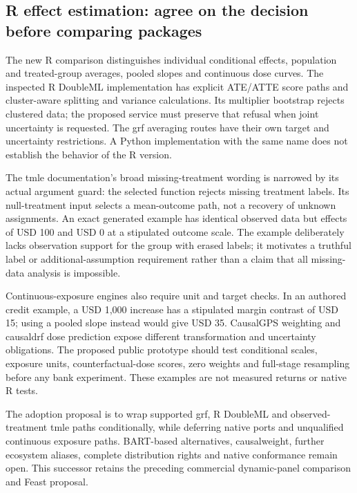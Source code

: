 \hypertarget{r-effect-estimation-agree-on-the-decision-before-comparing-packages}{%
\subsection{R effect estimation: agree on the decision before comparing
packages}\label{r-effect-estimation-agree-on-the-decision-before-comparing-packages}}

The new R comparison distinguishes individual conditional effects,
population and treated-group averages, pooled slopes and continuous dose
curves. The inspected R DoubleML implementation has explicit ATE/ATTE
score paths and cluster-aware splitting and variance calculations. Its
multiplier bootstrap rejects clustered data; the proposed service must
preserve that refusal when joint uncertainty is requested. The grf
averaging routes have their own target and uncertainty restrictions. A
Python implementation with the same name does not establish the behavior
of the R version. \citep{exec20_rfx_doubleml_r,exec13_grf_rpath}

The tmle documentation's broad missing-treatment wording is narrowed by
its actual argument guard: the selected function rejects missing
treatment labels. Its null-treatment input selects a mean-outcome path,
not a recovery of unknown assignments. An exact generated example has
identical observed data but effects of USD 100 and USD 0 at a stipulated
outcome scale. The example deliberately lacks observation support for
the group with erased labels; it motivates a truthful label or
additional-assumption requirement rather than a claim that all
missing-data analysis is impossible.
\citep{exec20_rfx_tmle,exec20_rfx_reference}

Continuous-exposure engines also require unit and target checks. In an
authored credit example, a USD 1,000 increase has a stipulated margin
contrast of USD 15; using a pooled slope instead would give USD 35.
CausalGPS weighting and causaldrf dose prediction expose different
transformation and uncertainty obligations. The proposed public
prototype should test conditional scales, exposure units,
counterfactual-dose scores, zero weights and full-stage resampling
before any bank experiment. These examples are not measured returns or
native R tests.
\citep{exec20_rfx_reference,exec20_rfx_causalgps,exec20_rfx_causaldrf}

The adoption proposal is to wrap supported grf, R DoubleML and
observed-treatment tmle paths conditionally, while deferring native
ports and unqualified continuous exposure paths. BART-based
alternatives, causalweight, further ecosystem aliases, complete
distribution rights and native conformance remain open. This successor
retains the preceding commercial dynamic-panel comparison and Feast
proposal. \citep{sp19dyn_reader,sp19dyn_progress}

